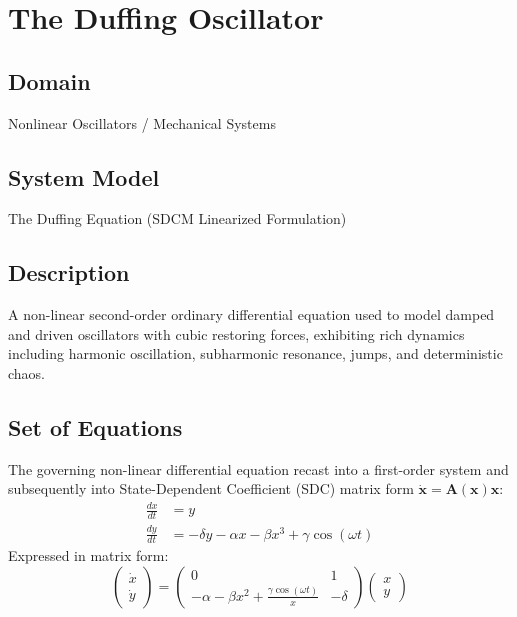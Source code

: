 \chapter{The Duffing Oscillator}

\section{Domain}
Nonlinear Oscillators / Mechanical Systems

\section{System Model}
The Duffing Equation (SDCM Linearized Formulation)

\section{Description}
A non-linear second-order ordinary differential equation used to model damped and driven oscillators with cubic restoring forces, exhibiting rich dynamics including harmonic oscillation, subharmonic resonance, jumps, and deterministic chaos.

\section{Set of Equations}
The governing non-linear differential equation recast into a first-order system and subsequently into State-Dependent Coefficient (SDC) matrix form $\dot{\mathbf{x}} = \mathbf{A}(\mathbf{x})\mathbf{x}$:
\begin{align}
\frac{dx}{dt} &= y \\
\frac{dy}{dt} &= -\delta y - \alpha x - \beta x^3 + \gamma \cos(\omega t)
\end{align}
Expressed in matrix form:
\begin{equation}
\begin{pmatrix} \dot{x} \\ \dot{y} \end{pmatrix} = \begin{pmatrix} 0 & 1 \\ -\alpha - \beta x^2 + \frac{\gamma \cos(\omega t)}{x} & -\delta \end{pmatrix} \begin{pmatrix} x \\ y \end{pmatrix}
\end{equation}

